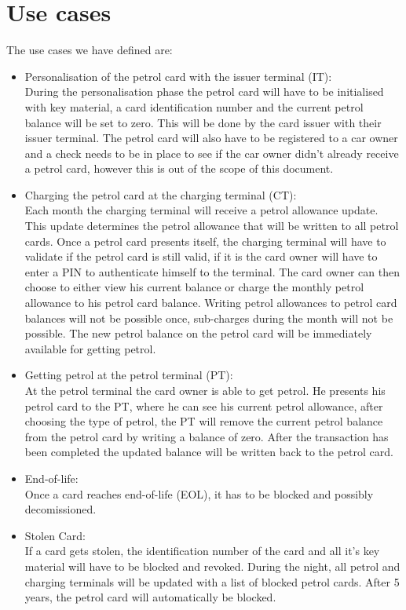 
\section{Use cases}
The use cases we have defined are:
\begin{itemize}

\item Personalisation of the petrol card with the issuer terminal (IT):\\
During the personalisation phase the petrol card will have to be initialised with key material, a card identification number and the current petrol balance will be set to zero. This will be done by the card issuer with their issuer terminal. The petrol card will also have to be registered to a car owner and a check needs to be in place to see if the car owner didn't already receive a petrol card, however this is out of the scope of this document.

\item Charging the petrol card at the charging terminal (CT): \\
Each month the charging terminal will receive a petrol allowance update. This update determines the petrol allowance that will be written to all petrol cards. Once a petrol card presents itself, the charging terminal will have to validate if the petrol card is still valid, if it is the card owner will have to enter a PIN to authenticate himself to the terminal. The card owner can then choose to either view his current balance or charge the monthly petrol allowance to his petrol card balance. Writing petrol allowances to petrol card balances will not be possible once, sub-charges during the month will not be possible. The new petrol balance on the petrol card will be immediately available for getting petrol. 

\item Getting petrol at the petrol terminal (PT):\\
At the petrol terminal the card owner is able to get petrol. He presents his petrol card to the PT, where he can see his current petrol allowance, after choosing the type of petrol, the PT will remove the current petrol balance from the petrol card by writing a balance of zero. After the transaction has been completed the updated balance will be written back to the petrol card. 

\item End-of-life: \\
Once a card reaches end-of-life (EOL), it has to be blocked and possibly decomissioned. 

\item Stolen Card: \\
If a card gets stolen, the identification number of the card and all it's key material will have to be blocked and revoked. During the night, all petrol and charging terminals will be updated with a list of blocked petrol cards. After 5 years, the petrol card will automatically be blocked.

\end{itemize}